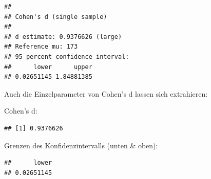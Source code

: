 \documentclass[
]{book}
\newenvironment{Shaded}{\begin{snugshade}}{\end{snugshade}}
\newcommand{\AttributeTok}[1]{\textcolor[rgb]{0.13,0.29,0.53}{#1}}
\newcommand{\ConstantTok}[1]{\textcolor[rgb]{0.56,0.35,0.01}{#1}}
\newcommand{\DecValTok}[1]{\textcolor[rgb]{0.00,0.00,0.81}{#1}}
\newcommand{\FunctionTok}[1]{\textcolor[rgb]{0.13,0.29,0.53}{\textbf{#1}}}
\newcommand{\NormalTok}[1]{#1}
\newcommand{\SpecialCharTok}[1]{\textcolor[rgb]{0.81,0.36,0.00}{\textbf{#1}}}
\begin{document}
\begin{verbatim}
## 
## Cohen's d (single sample)
## 
## d estimate: 0.9376626 (large)
## Reference mu: 173
## 95 percent confidence interval:
##      lower      upper 
## 0.02651145 1.84881385
\end{verbatim}

Auch die Einzelparameter von Cohen's d lassen sich extrahieren:

Cohen's d:

\begin{Shaded}
\end{Shaded}

\begin{verbatim}
## [1] 0.9376626
\end{verbatim}

Grenzen des Konfidenzintervalls (unten \& oben):

\begin{Shaded}
\end{Shaded}

\begin{verbatim}
##      lower 
## 0.02651145
\end{verbatim}

\begin{Shaded}
\end{Shaded}
\end{document}
